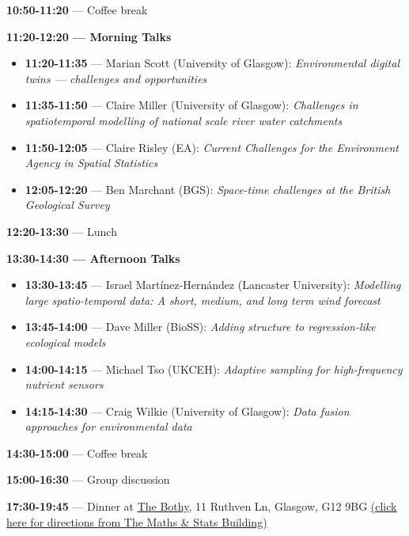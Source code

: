 \documentclass[
  11pt,
  letterpaper,
  DIV=11,
  numbers=noendperiod]{scrartcl}
\begin{document}
\textbf{10:50-11:20} --- Coffee break

\textbf{11:20-12:20 --- Morning Talks}

\begin{itemize}
\item
  \textbf{11:20-11:35} --- Marian Scott (University of Glasgow):
  \emph{Environmental digital twins --- challenges and opportunities}
\item
  \textbf{11:35-11:50} --- Claire Miller (University of Glasgow):
  \emph{Challenges in spatiotemporal modelling of national scale river
  water catchments}
\item
  \textbf{11:50-12:05} --- Claire Risley (EA): \emph{Current Challenges
  for the Environment Agency in Spatial Statistics}
\item
  \textbf{12:05-12:20} --- Ben Marchant (BGS): \emph{Space-time
  challenges at the British Geological Survey}
\end{itemize}

\textbf{12:20-13:30} --- Lunch

\textbf{13:30-14:30 --- Afternoon Talks}

\begin{itemize}
\item
  \textbf{13:30-13:45} --- Israel Martínez-Hernández (Lancaster
  University): \emph{Modelling large spatio-temporal data: A short,
  medium, and long term wind forecast}
\item
  \textbf{13:45-14:00} --- Dave Miller (BioSS): \emph{Adding structure
  to regression-like ecological models}
\item
  \textbf{14:00-14:15} --- Michael Tso (UKCEH): \emph{Adaptive sampling
  for high-frequency nutrient sensors}
\item
  \textbf{14:15-14:30} --- Craig Wilkie (University of Glasgow):
  \emph{Data fusion approaches for environmental data}
\end{itemize}

\textbf{14:30-15:00} --- Coffee break

\textbf{15:00-16:30} --- Group discussion

\textbf{17:30-19:45} --- Dinner at
\href{https://bothyglasgow.co.uk/}{The Bothy}, 11 Ruthven Ln, Glasgow,
G12 9BG
\href{https://www.google.com/maps/dir/Mathematics+and+Statistics+Building,+132+University+Pl,+Glasgow+G12+8TA,+UK/Bothy+Glasgow,+Ruthven+Lane,+Glasgow/@55.8739913,-4.2977924,511m/data=!3m2!1e3!4b1!4m14!4m13!1m5!1m1!1s0x488845cfd066d839:0xeab86bed8f92f0d0!2m2!1d-4.2944843!2d55.8726073!1m5!1m1!1s0x488845cf1ccbb223:0x8ef11cd374daaf1d!2m2!1d-4.2944528!2d55.8753694!3e3?entry=ttu&g_ep=EgoyMDI1MDYwNC4wIKXMDSoASAFQAw\%3D\%3D}{(click
here for directions from The Maths \& Stats Building)}
\end{document}
